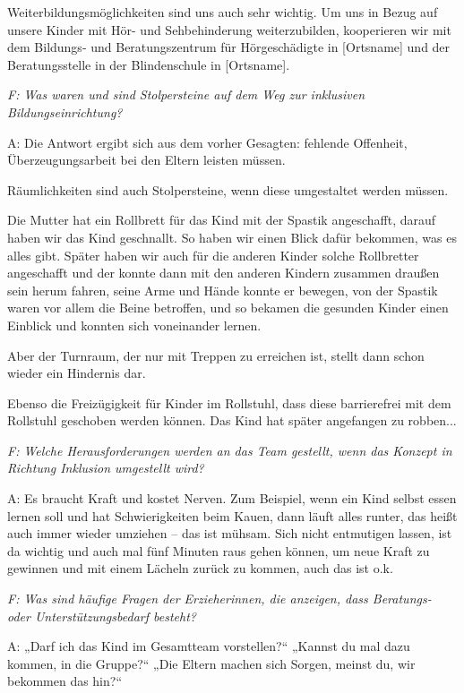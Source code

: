 \begin{linenumbers*}
 Weiterbildungsmöglichkeiten sind uns auch sehr wichtig. 
Um uns in Bezug auf unsere Kinder mit Hör- und Sehbehinderung weiterzubilden, kooperieren wir mit dem Bildungs- und Beratungszentrum für Hörgeschädigte in [Ortsname] und der Beratungsstelle in der Blindenschule in [Ortsname].   

\emph{F: Was waren und sind Stolpersteine auf dem Weg zur inklusiven Bildungseinrichtung?} 

A: Die Antwort ergibt sich aus dem vorher Gesagten: fehlende Offenheit, Überzeugungsarbeit bei den Eltern leisten müssen.  

Räumlichkeiten sind auch Stolpersteine, wenn diese umgestaltet werden müssen.
 
Die Mutter hat ein Rollbrett für das Kind mit der Spastik angeschafft, darauf haben wir das Kind geschnallt. So haben wir einen Blick dafür bekommen, was es alles gibt. Später haben wir auch für die anderen Kinder solche Rollbretter angeschafft und der konnte dann mit den anderen Kindern zusammen draußen sein herum fahren, seine Arme und Hände konnte er bewegen, von der Spastik waren vor allem die Beine betroffen, und so bekamen die gesunden Kinder einen Einblick und konnten sich voneinander lernen. 
 
Aber der Turnraum, der nur mit Treppen zu erreichen ist, stellt dann schon wieder ein Hindernis dar.

Ebenso die Freizügigkeit für Kinder im Rollstuhl, dass diese barrierefrei mit dem Rollstuhl geschoben werden können. 
Das Kind hat später angefangen zu robben...

\emph{F: Welche Herausforderungen werden an das Team gestellt, wenn das Konzept in Richtung Inklusion umgestellt wird?}

A: Es braucht Kraft und kostet Nerven. Zum Beispiel, wenn ein Kind selbst essen lernen soll und hat Schwierigkeiten beim Kauen, dann läuft alles runter, das heißt auch immer wieder umziehen -- das ist mühsam. Sich nicht entmutigen lassen, ist da wichtig und auch mal fünf Minuten raus gehen können, um neue Kraft zu gewinnen und mit einem Lächeln zurück zu kommen, auch das ist o.k.  

\emph{F: Was sind häufige Fragen der Erzieherinnen, die anzeigen, dass Beratungs- oder Unterstützungsbedarf besteht?}

A: „Darf ich das Kind im Gesamtteam vorstellen?“ „Kannst du mal dazu kommen, in die Gruppe?“ „Die Eltern machen sich Sorgen, meinst du, wir bekommen das hin?“  


\end{linenumbers*}
